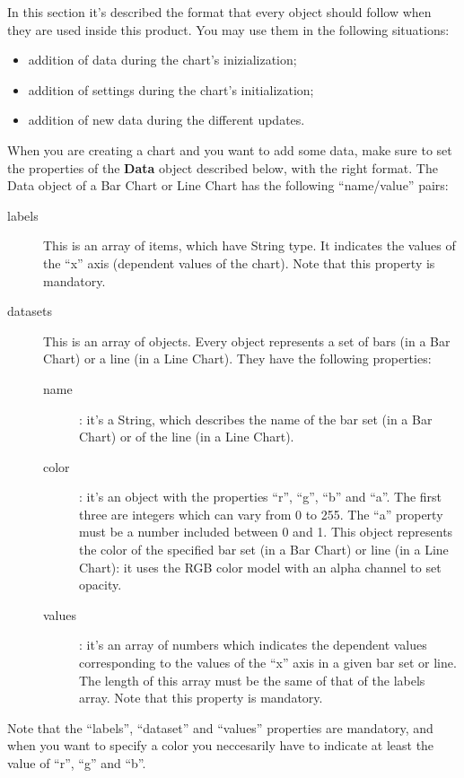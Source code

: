 	In this section it's described the format that every  object should follow when they are used inside this product. You may use them in the following situations:
	\begin{itemize}
		\item addition of data during the chart's inizialization;
		\item addition of settings during the chart's initialization;
		\item addition of new data during the different updates.
	\end{itemize}

		When you are creating a chart and you want to add some data, make sure to set the properties of the \textbf{Data} object described below, with the right format.
		 \label{sec:dataBarLine}
			The Data object of a Bar Chart or Line Chart has the following “name/value” pairs:
			\begin{description}
				\item[labels] This is an array of items, which have String type. It indicates the values of the “x” axis (dependent values of the chart). Note that this property is mandatory.
				\item[datasets] This is an array of objects. Every object represents a set of bars (in a Bar Chart) or a line (in a Line Chart). They have the following properties: 
				\begin{description}
					\item[name]: it's a String, which describes the name of the bar set (in a Bar Chart) or of the line (in a Line Chart). 
					\item[color]: it's an object with the properties “r”, “g”, “b” and “a”. The first three are integers which can vary from 0 to 255. The “a” property must be a number included between 0 and 1. This object represents the color of the specified bar set (in a Bar Chart) or line (in a Line Chart): it uses the RGB color model with an alpha channel to set opacity.
					\item[values]: it's an array of numbers which indicates the dependent values corresponding to the values of the “x” axis in a given bar set or line. The length of this array must be the same of that of the labels array. Note that this property is mandatory.
				\end{description}
			\end{description}
			Note that the “labels”, “dataset” and “values” properties are mandatory, and when you want to specify a color you neccesarily have to indicate at least the value of “r”, “g” and “b”.
